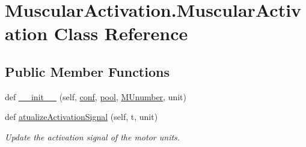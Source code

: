 \hypertarget{class_muscular_activation_1_1_muscular_activation}{}\section{Muscular\+Activation.\+Muscular\+Activation Class Reference}
\label{class_muscular_activation_1_1_muscular_activation}
\subsection*{Public Member Functions}
\begin{DoxyCompactItemize}
\item 
def \hyperlink{class_muscular_activation_1_1_muscular_activation_aad217ef6c3d6d7318ea3530a814b3738}{\+\_\+\+\_\+init\+\_\+\+\_\+} (self, \hyperlink{class_muscular_activation_1_1_muscular_activation_ab2eab8fb62d5338707e3921e26560a3f}{conf}, \hyperlink{class_muscular_activation_1_1_muscular_activation_aeed87c16618be36ed95f44d38a988f1f}{pool}, \hyperlink{class_muscular_activation_1_1_muscular_activation_a1b30292b1cf102fa82bf4a511d151f0b}{M\+Unumber}, unit)
\item 
def \hyperlink{class_muscular_activation_1_1_muscular_activation_a426e8eca6ca1f9ed3999a07764ccb8fb}{atualize\+Activation\+Signal} (self, t, unit)
\begin{DoxyCompactList}\small\item\em Update the activation signal of the motor units. \end{DoxyCompactList}\end{DoxyCompactItemize}
